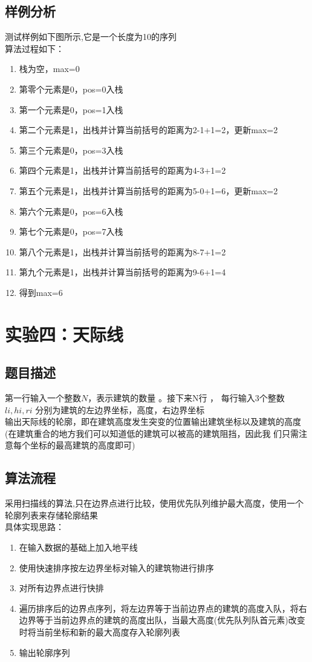 \documentclass[UTF8,a4paperdui, %
]{ctexart}
\begin{document}
\subsection{样例分析}
测试样例如下图所示,它是一个长度为10的序列
\\
算法过程如下：
\begin{enumerate}
    \item 栈为空，max=0
    \item 第零个元素是0，pos=0入栈
    \item 第一个元素是0，pos=1入栈
    \item 第二个元素是1，出栈并计算当前括号的距离为2-1+1=2，更新max=2
    \item 第三个元素是0，pos=3入栈
    \item 第四个元素是1，出栈并计算当前括号的距离为4-3+1=2
    \item 第五个元素是1，出栈并计算当前括号的距离为5-0+1=6，更新max=2
    \item 第六个元素是0，pos=6入栈
    \item 第七个元素是0，pos=7入栈
    \item 第八个元素是1，出栈并计算当前括号的距离为8-7+1=2
    \item 第九个元素是1，出栈并计算当前括号的距离为9-6+1=4
    \item 得到max=6
\end{enumerate}

\newpage
\section{实验四：天际线}
\subsection{题目描述}
第一行输入一个整数$N$，表示建筑的数量 。接下来N行 ， 每行输入3个整数$li ,hi ,ri$ 分别为建筑的左边界坐标，高度，右边界坐标\\
输出天际线的轮廓，即在建筑高度发生突变的位置输出建筑坐标以及建筑的高度(在建筑重合的地方我们可以知道低的建筑可以被高的建筑阻挡，因此我
们只需注意每个坐标的最高建筑的高度即可)

\subsection{算法流程}
采用扫描线的算法,只在边界点进行比较，使用优先队列维护最大高度，使用一个轮廓列表来存储轮廓结果\\
具体实现思路：
\begin{enumerate}
    \item 在输入数据的基础上加入地平线
    \item 使用快速排序按左边界坐标对输入的建筑物进行排序
    \item 对所有边界点进行快排
    \item 遍历排序后的边界点序列，将左边界等于当前边界点的建筑的高度入队，将右边界等于当前边界点的建筑的高度出队，当最大高度(优先队列队首元素)改变时将当前坐标和新的最大高度存入轮廓列表
    \item 输出轮廓序列
\end{enumerate}
\end{document}
